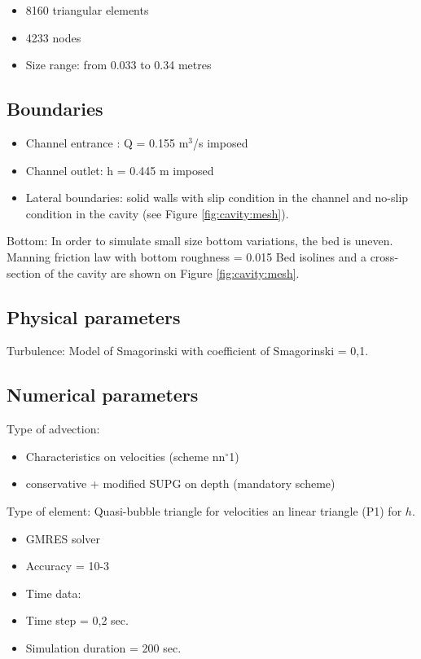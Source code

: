 \begin{itemize}
\item 8160 triangular elements
\item 4233 nodes
\item Size range: from 0.033 to 0.34 metres
\end{itemize}

\subsection{Boundaries}

\begin{itemize}
\item Channel entrance : Q = 0.155 m${}^{3}$/s imposed
\item Channel outlet: h = 0.445 m imposed
\item Lateral boundaries: solid walls with slip condition in the channel and no-slip
condition in the cavity (see Figure \ref{fig:cavity:mesh}).
\end{itemize}

Bottom:
In order to simulate small size bottom variations, the bed is uneven.
Manning friction law with bottom roughness = 0.015
Bed isolines and a cross-section of the cavity are shown on Figure \ref{fig:cavity:mesh}.


\subsection{Physical parameters}

Turbulence: Model of Smagorinski with coefficient of Smagorinski = 0,1.

\subsection{Numerical parameters}

Type of advection:
\begin{itemize}
\item Characteristics on velocities (scheme nn$\mathrm{{}^\circ}$1)
\item conservative + modified SUPG on depth (mandatory scheme)
\end{itemize}

Type of element: Quasi-bubble triangle for velocities an linear triangle (P1) for $h$.

\begin{itemize}
\item GMRES solver
\item Accuracy = 10-3
\item Time data:
\item Time step = 0,2 sec.
\item Simulation duration = 200 sec.
\end{itemize}

